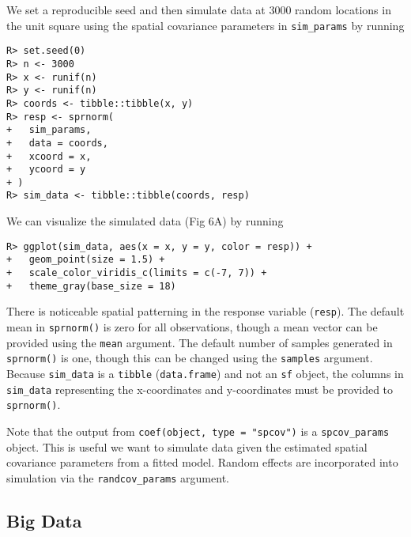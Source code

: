 \documentclass[10pt,letterpaper]{article}
\begin{document}
We set a reproducible seed and then simulate data at 3000 random
locations in the unit square using the spatial covariance parameters in
\texttt{sim\_params} by running

\begin{verbatim}
R> set.seed(0)
R> n <- 3000
R> x <- runif(n)
R> y <- runif(n)
R> coords <- tibble::tibble(x, y)
R> resp <- sprnorm(
+   sim_params,
+   data = coords,
+   xcoord = x,
+   ycoord = y
+ )
R> sim_data <- tibble::tibble(coords, resp)
\end{verbatim}

We can visualize the simulated data (Fig 6A) by running

\begin{verbatim}
R> ggplot(sim_data, aes(x = x, y = y, color = resp)) +
+   geom_point(size = 1.5) +
+   scale_color_viridis_c(limits = c(-7, 7)) + 
+   theme_gray(base_size = 18)
\end{verbatim}

There is noticeable spatial patterning in the response variable
(\texttt{resp}). The default mean in \texttt{sprnorm()} is zero for all
observations, though a mean vector can be provided using the
\texttt{mean} argument. The default number of samples generated in
\texttt{sprnorm()} is one, though this can be changed using the
\texttt{samples} argument. Because \texttt{sim\_data} is a
\texttt{tibble} (\texttt{data.frame}) and not an \texttt{sf} object, the
columns in \texttt{sim\_data} representing the x-coordinates and
y-coordinates must be provided to \texttt{sprnorm()}.

Note that the output from \texttt{coef(object,\ type\ =\ "spcov")} is a
\texttt{spcov\_params} object. This is useful we want to simulate data
given the estimated spatial covariance parameters from a fitted model.
Random effects are incorporated into simulation via the
\texttt{randcov\_params} argument.

\hypertarget{big-data}{%
\subsection{Big Data}\label{big-data}}
\end{document}
